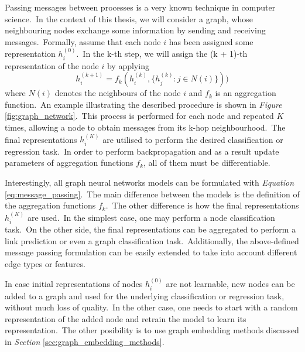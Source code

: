 \documentclass[longabstract, english, mgr]{iithesis}
\theoremstyle{default_theorem_style}\newtheorem{theorem}{Theorem}
\theoremstyle{default_theorem_style}\newtheorem{definition}{Definition}
\begin{document}
Passing messages between processes is a very known technique in computer science.\ In the context of this thesis, we
will consider a graph, whose neighbouring nodes exchange some information by sending and receiving
messages.\ Formally, assume that each node $i$ has been assigned some representation $h_i^{(0)}$.\ In the k-th
step, we will assign the (k + 1)-th representation of the node $i$ by applying
\begin{equation}\label{eq:message_passing}
h_i^{(k + 1)} = f_k(h_i^{(k)}, \{h_j^{(k)} : j \in N(i)\}))
\end{equation}
where $N(i)$ denotes the neighbours of the node $i$ and $f_k$ is an aggregation function.\ An example illustrating
the described procedure is shown in \textit{Figure} \ref{fig:graph_network}.\ This process is performed
for each node and repeated $K$ times, allowing a node to obtain messages from its k-hop neighbourhood.\ The
final representations $h_i^{(K)}$ are utilised to perform the desired classification or regression task.\ In order to
perform backpropagation and as a result update parameters of aggregation functions $f_k$, all of them must be
differentiable.\newline

\noindent Interestingly, all graph neural networks models can be formulated with
\textit{Equation} \ref{eq:message_passing}.\ The main difference between the models is the definition of the
aggregation functions $f_k$.\ The other difference is how the final representations $h_i^{(K)}$ are used.\ In the
simplest case, one may perform a node classification task.\ On the other side, the final representations can be
aggregated to perform a link prediction or even a graph classification task.\ Additionally, the above-defined
message passing formulation can be easily extended to take into account different edge types or features.\newline

\noindent In case initial representations of nodes $h_i^{(0)}$ are not learnable, new nodes can be added to a graph and
used for the underlying classification or regression task, without much loss of quality.\ In the other case, one needs
to start with a random representation of the added node and retrain the model to learn its representation.\ The other
posibility is to use graph embedding methods discussed in \textit{Section} \ref{sec:graph_embedding_methods}.
\end{document}
